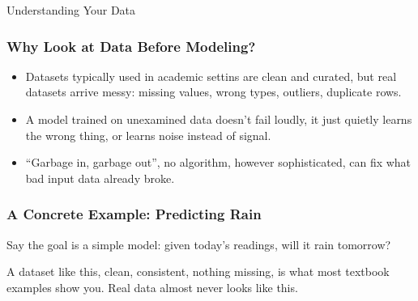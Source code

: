 \begin{frame}
  \begin{center}
    {\Large Understanding Your Data}
  \end{center}
\end{frame}

\begin{frame}[fragile]\frametitle{Why Look at Data Before Modeling?}
\begin{itemize}
\item Datasets typically used in academic settins are clean and curated, but real datasets
  arrive messy: missing values, wrong types, outliers, duplicate rows.
\item A model trained on unexamined data doesn't fail loudly, it just quietly learns the
  wrong thing, or learns noise instead of signal.
\item ``Garbage in, garbage out'', no algorithm, however sophisticated, can fix what bad
  input data already broke.
\end{itemize}
\end{frame}

\begin{frame}[fragile]\frametitle{A Concrete Example: Predicting Rain}
Say the goal is a simple model: given today's readings, will it rain tomorrow?
\begin{center}
\end{center}
A dataset like this, clean, consistent, nothing missing, is what most textbook examples show
you. Real data almost never looks like this.
\end{frame}


